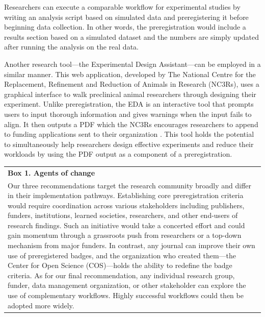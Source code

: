 \documentclass[authordate, meta, issue]{jote-new-article}
\begin{document}
Researchers can execute a comparable workflow for experimental studies by writing an analysis script based on simulated data and preregistering it before beginning data collection. In other words, the preregistration would include a results section based on a simulated dataset and the numbers are simply updated after running the analysis on the real data.







Another research tool—the Experimental Design Assistant—can be employed in a similar manner. This web application, developed by The National Centre for the Replacement, Refinement and Reduction of Animals in Research (NC3Rs), uses a graphical interface to walk preclinical animal researchers through designing their experiment. Unlike preregistration, the EDA is an interactive tool that prompts users to input thorough information and gives warnings when the input fails to align. It then outputs a PDF which the NC3Rs encourages researchers to append to funding applications sent to their organization \parencites{NC3Rs2021}. This tool holds the potential to simultaneously help researchers design effective experiments and reduce their workloads by using the PDF output as a component of a preregistration.




\begin{table}[b!]
  \begin{fullwidth}
    \begin{tabularx}{\textwidth}{@{} X @{}}
      \textbf{Box 1. Agents of change} \\
      Our three recommendations target the research community broadly and differ in their implementation pathways. Establishing core preregistration criteria would require coordination across various stakeholders including publishers, funders, institutions, learned societies, researchers, and other end-users of research findings. Such an initiative would take a concerted effort and could gain momentum through a grassroots push from researchers or a top-down mechanism from major funders. In contrast, any journal can improve their own use of preregistered badges, and the organization who created them—the Center for Open Science (COS)—holds the ability to redefine the badge criteria. As for our final recommendation, any individual research group, funder, data management organization, or other stakeholder can explore the use of complementary workflows. Highly successful workflows could then be adopted more widely.
    \end{tabularx}
  \end{fullwidth}
\end{table}
\end{document}
